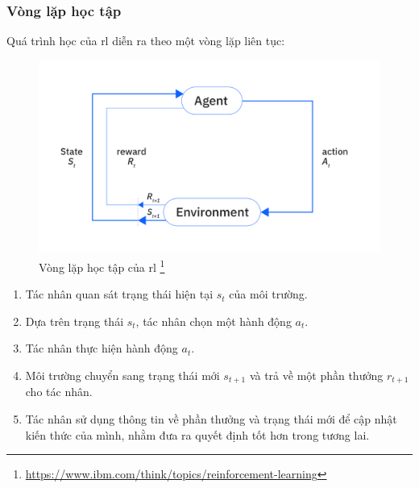 \subsubsection{Vòng lặp học tập}

Quá trình học của \ac{rl} diễn ra theo một vòng lặp liên tục:

\begin{figure}[!htp]
    \centering
    \includegraphics[width=\textwidth]{img/RL_components.png}
    \caption{Vòng lặp học tập của \ac{rl} \footnote{\url{https://www.ibm.com/think/topics/reinforcement-learning}}}
    \label{fig:enter-label}
\end{figure}

\begin{enumerate}
    \item Tác nhân quan sát trạng thái hiện tại $s_{t}$ của môi trường.

    \item Dựa trên trạng thái $s_{t}$, tác nhân chọn một hành động $a_{t}$.

    \item Tác nhân thực hiện hành động $a_{t}$.

    \item Môi trường chuyển sang trạng thái mới $s_{t+1}$ và trả về một phần thưởng
        $r_{t+1}$ cho tác nhân.

    \item Tác nhân sử dụng thông tin về phần thưởng và trạng thái mới để cập nhật
        kiến thức của mình, nhằm đưa ra quyết định tốt hơn trong tương lai.
\end{enumerate}

